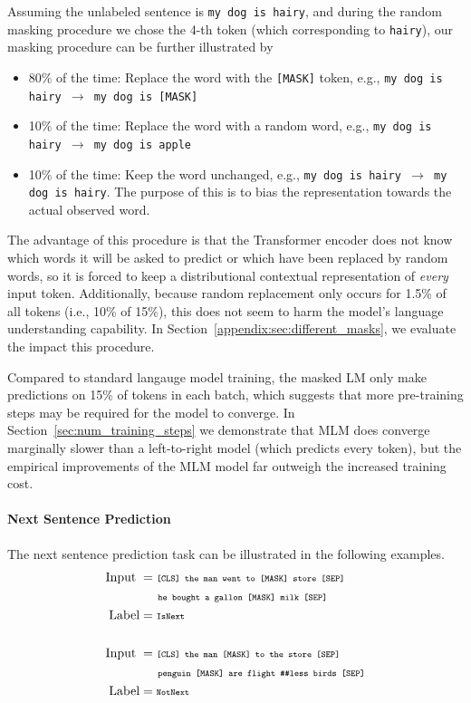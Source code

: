 \documentclass[11pt,a4paper]{article}
\begin{document}
Assuming the unlabeled sentence is {\tt {\small my dog is hairy}}, 
and during the random masking procedure we chose the 4-th token (which corresponding to {\tt {\small hairy}}), our masking procedure
can be further illustrated by
\begin{itemize}
\item 80\% of the time: Replace the word with the {\tt [MASK]} token, e.g., {\tt {\small my dog is hairy $\rightarrow$ my dog is [MASK]}}
\item 10\% of the time: Replace the word with a random word, e.g., {\tt {\small my dog is hairy $\rightarrow$ my dog is apple}}
\item 10\% of the time: Keep the word unchanged, e.g., {\tt {\small my dog is hairy $\rightarrow$ my dog is hairy}}. The purpose of this is to bias the representation towards the actual observed word.
\end{itemize}

The advantage of this procedure is that the Transformer encoder does not know which words it will be asked to predict or which have been replaced by random words, so it is forced to keep a distributional contextual representation of {\it every} input token. Additionally, because random replacement only occurs for 1.5\% of all tokens (i.e., 10\% of 15\%), this does not seem to harm the model's language understanding capability. In Section~\ref{appendix:sec:different_masks},
we evaluate the impact this procedure.

Compared to standard langauge model training, the masked LM only
make predictions on 15\% of tokens in each batch, which suggests that more pre-training steps may be required for the model to converge. In Section~\ref{sec:num_training_steps} we demonstrate that MLM does converge marginally slower than a left-to-right model (which predicts every token), but the empirical improvements of the MLM model far outweigh the increased training cost.

\paragraph{Next Sentence Prediction} 

The next sentence prediction task can be illustrated in the following examples.
\begin{align*}
\text{Input\;} &= \text{\tt {\scriptsize [CLS] the man went to [MASK] store [SEP]}} \\ 
& \text{\tt {\scriptsize \;\;\;\;\;\;\;he bought a gallon [MASK] milk [SEP]}}\\
\text{Label} &= \text{\tt {\scriptsize IsNext}} \\
\\
\text{Input\;} &= \text{\tt {\scriptsize [CLS] the man [MASK] to the store [SEP]}}\\
&\text{\tt {\scriptsize \;\;\;\;\;\;\;penguin [MASK] are flight \#\#less birds [SEP]}}\\
\text{Label} &= \text{\tt {\scriptsize NotNext}}
\end{align*}
\end{document}
